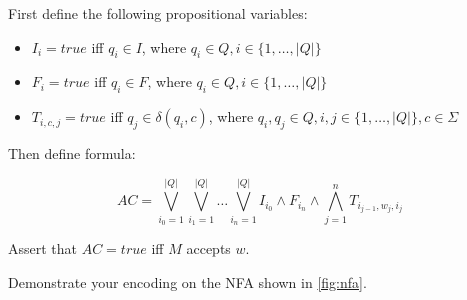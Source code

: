 \documentclass[11pt,a4paper]{article}
\begin{document}

\begin{solution}
    First define the following propositional variables:
    
    \begin{itemize}
    	\item $I_i = true$ iff $q_i \in I$, where $q_i \in Q, i \in \{1, \ldots, \left | Q \right |\}$
    	\item $F_i = true$ iff $q_i \in F$, where $q_i \in Q, i \in \{1, \ldots, \left | Q \right |\}$
    	\item $T_{i, c, j} = true$ iff $q_j \in \delta(q_i, c)$, where $q_i, q_j \in Q, i, j \in \{1, \ldots, \left | Q \right |\}, c \in \Sigma$
    \end{itemize}

	Then define formula:
	
	$$AC = \bigvee_{i_0 = 1}^{\left | Q \right |} \bigvee_{i_1 = 1}^{\left | Q \right |} \ldots \bigvee_{i_n = 1}^{\left | Q \right |} I_{i_0} \land F_{i_n} \land \bigwedge_{j = 1}^n T_{i_{j - 1}, w_j, i_j}$$
	
	Assert that $AC = true$ iff $M$ accepts $w$.
\end{solution}

\subproblem Demonstrate your encoding on the NFA shown in \cref{fig:nfa}.
\end{document}
